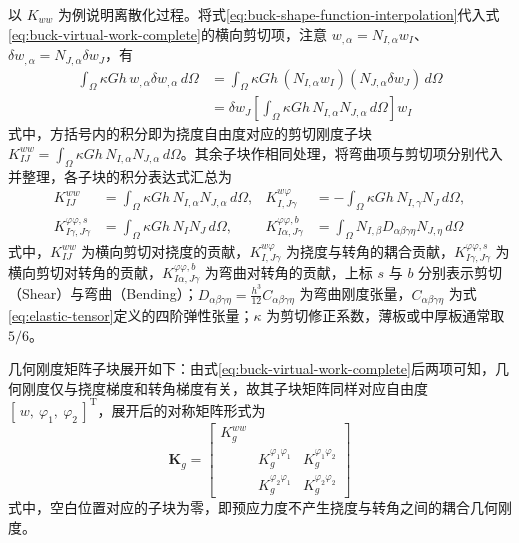 以 $K_{ww}$ 为例说明离散化过程。将式\eqref{eq:buck-shape-function-interpolation}代入式\eqref{eq:buck-virtual-work-complete}的横向剪切项，注意 $w_{,\alpha} = N_{I,\alpha}w_I$、$\delta w_{,\alpha} = N_{J,\alpha}\delta w_J$，有
\begin{equation}
\begin{aligned}
\int_\Omega \kappa G h\, w_{,\alpha}\delta w_{,\alpha}\, d\Omega
&= \int_\Omega \kappa G h\, (N_{I,\alpha}w_I)(N_{J,\alpha}\delta w_J)\, d\Omega \\
&= \delta w_J \left[\int_\Omega \kappa G h\, N_{I,\alpha}N_{J,\alpha}\, d\Omega\right] w_I
\end{aligned}
\label{eq:kww-chain}
\end{equation}
式中，方括号内的积分即为挠度自由度对应的剪切刚度子块 $K_{IJ}^{ww} = \int_\Omega \kappa G h\, N_{I,\alpha}N_{J,\alpha}\, d\Omega$。其余子块作相同处理，将弯曲项与剪切项分别代入并整理，各子块的积分表达式汇总为
\begin{equation}
\begin{aligned}
K_{IJ}^{ww} &= \int_\Omega \kappa G h\, N_{I,\alpha}N_{J,\alpha}\, d\Omega, &
K_{I,J\gamma}^{w\varphi} &= -\int_\Omega \kappa G h\, N_{I,\gamma}N_J\, d\Omega, \\
K_{I\gamma,J\gamma}^{\varphi\varphi,s} &= \int_\Omega \kappa G h\, N_I N_J\, d\Omega, &
K_{I\alpha,J\gamma}^{\varphi\varphi,b} &= \int_\Omega N_{I,\beta}D_{\alpha\beta\gamma\eta}N_{J,\eta}\, d\Omega
\end{aligned}
\label{eq:kb-subblocks}
\end{equation}
式中，$K_{IJ}^{ww}$ 为横向剪切对挠度的贡献，$K_{I,J\gamma}^{w\varphi}$ 为挠度与转角的耦合贡献，$K_{I\gamma,J\gamma}^{\varphi\varphi,s}$ 为横向剪切对转角的贡献，$K_{I\alpha,J\gamma}^{\varphi\varphi,b}$ 为弯曲对转角的贡献，上标 $s$ 与 $b$ 分别表示剪切（Shear）与弯曲（Bending）；$D_{\alpha\beta\gamma\eta} = \frac{h^3}{12}C_{\alpha\beta\gamma\eta}$ 为弯曲刚度张量，$C_{\alpha\beta\gamma\eta}$ 为式\eqref{eq:elastic-tensor}定义的四阶弹性张量；$\kappa$ 为剪切修正系数，薄板或中厚板通常取 $5/6$。

几何刚度矩阵子块展开如下：由式\eqref{eq:buck-virtual-work-complete}后两项可知，几何刚度仅与挠度梯度和转角梯度有关，故其子块矩阵同样对应自由度 $[\,w,\ \varphi_1,\ \varphi_2\,]^{\mathrm{T}}$，展开后的对称矩阵形式为
\begin{equation}
\mathbf{K}_g = \begin{bmatrix}
K_g^{ww} & & \\
& K_g^{\varphi_1\varphi_1} & K_g^{\varphi_1\varphi_2} \\
& K_g^{\varphi_2\varphi_1} & K_g^{\varphi_2\varphi_2}
\end{bmatrix}
\label{eq:kg-matrix}
\end{equation}
式中，空白位置对应的子块为零，即预应力度不产生挠度与转角之间的耦合几何刚度。

